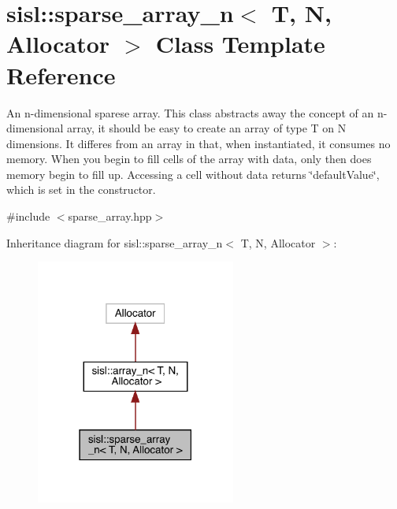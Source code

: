 \hypertarget{classsisl_1_1sparse__array__n}{}\section{sisl\+:\+:sparse\+\_\+array\+\_\+n$<$ T, N, Allocator $>$ Class Template Reference}
\label{classsisl_1_1sparse__array__n}


An n-\/dimensional sparese array. This class abstracts away the concept of an n-\/dimensional array, it should be easy to create an array of type T on N dimensions. It differes from an array in that, when instantiated, it consumes no memory. When you begin to fill cells of the array with data, only then does memory begin to fill up. Accessing a cell without data returns \char`\"{}default\+Value\char`\"{}, which is set in the constructor.  




{\ttfamily \#include $<$sparse\+\_\+array.\+hpp$>$}



Inheritance diagram for sisl\+:\+:sparse\+\_\+array\+\_\+n$<$ T, N, Allocator $>$\+:\nopagebreak
\begin{figure}[H]
\begin{center}
\leavevmode
\includegraphics[width=186pt]{classsisl_1_1sparse__array__n__inherit__graph}
\end{center}
\end{figure}


